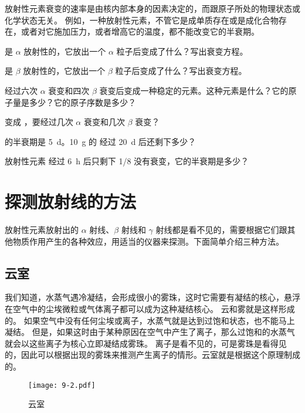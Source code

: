 放射性元素衰变的速率是由核内部本身的因素决定的，而跟原子所处的物理状态或化学状态无关。
例如，一种放射性元素，不管它是成单质存在或是成化合物存在，或者对它施加压力，或者增高它的温度，都不能改变它的半衰期。

\begin{Practice}
\begin{question}
  \item {} 是 $\alpha$ 放射性的，它放出一个 $\alpha$ 粒子后变成了什么？写出衰变方程。
  \item {} 是 $\beta$ 放射性的，它放出一个 $\beta$ 粒子后变成了什么？写出衰变方程。
  \item {} 经过六次 $\alpha$ 衰变和四次 $\beta$ 衰变后变成一种稳定的元素。这种元素是什么？它的原子量是多少？它的原子序数是多少？
  \item {} 变成 ，要经过几次 $\alpha$ 衰变和几次 $\beta$ 衰变？
  \item {} 的半衰期是 \qty{5}{d}。\qty{10}{g} 的  经过 \qty{20}{d} 后还剩下多少？
  \item 放射性元素  经过 \qty{6}{h} 后只剩下 1/8 没有衰变，它的半衰期是多少？
\end{question}
\end{Practice}

\section{探测放射线的方法}
放射性元素放射出的 $\alpha$ 射线、$\beta$ 射线和 $\gamma$ 射线都是看不见的，需要根据它们跟其他物质作用产生的各种效应，用适当的仪器来探测。下面简单介绍三种方法。

\subsection{云室}
我们知道，水蒸气遇冷凝结，会形成很小的雾珠，这时它需要有凝结的核心，悬浮在空气中的尘埃微粒或气体离子都可以成为这种凝结核心。
云和雾就是这样形成的。
如果空气中没有任何尘埃或离子，水蒸气就是达到过饱和状态，也不能马上凝结。
但是，如果这时由于某种原因在空气中产生了离子，那么过饱和的水蒸气就会以这些离子为核心立即凝结成雾珠。
离子是看不见的，可是雾珠是看得见的，因此可以根据出现的雾珠来推测产生离子的情形。云室就是根据这个原理制成的。

\begin{figure}
  \texttt{[image: 9-2.pdf]}
  \caption{云室}\label{fig:9-2}
\end{figure}

